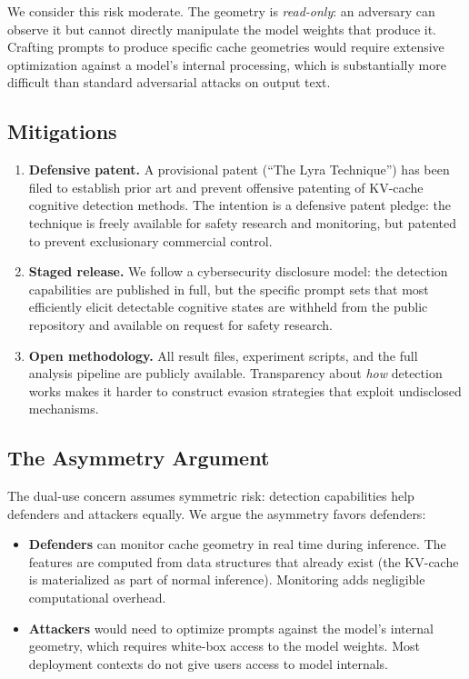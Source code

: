 We consider this risk moderate. The geometry is \emph{read-only}: an adversary can observe it but cannot directly manipulate the model weights that produce it. Crafting prompts to produce specific cache geometries would require extensive optimization against a model's internal processing, which is substantially more difficult than standard adversarial attacks on output text.

\subsection{Mitigations}

\begin{enumerate}[leftmargin=*]
    \item \textbf{Defensive patent.} A provisional patent (``The Lyra Technique'') has been filed to establish prior art and prevent offensive patenting of KV-cache cognitive detection methods. The intention is a defensive patent pledge: the technique is freely available for safety research and monitoring, but patented to prevent exclusionary commercial control.

    \item \textbf{Staged release.} We follow a cybersecurity disclosure model: the detection capabilities are published in full, but the specific prompt sets that most efficiently elicit detectable cognitive states are withheld from the public repository and available on request for safety research.

    \item \textbf{Open methodology.} All result files, experiment scripts, and the full analysis pipeline are publicly available. Transparency about \emph{how} detection works makes it harder to construct evasion strategies that exploit undisclosed mechanisms.
\end{enumerate}

\subsection{The Asymmetry Argument}

The dual-use concern assumes symmetric risk: detection capabilities help defenders and attackers equally. We argue the asymmetry favors defenders:

\begin{itemize}[leftmargin=*]
    \item \textbf{Defenders} can monitor cache geometry in real time during inference. The features are computed from data structures that already exist (the KV-cache is materialized as part of normal inference). Monitoring adds negligible computational overhead.
    \item \textbf{Attackers} would need to optimize prompts against the model's internal geometry, which requires white-box access to the model weights. Most deployment contexts do not give users access to model internals.
\end{itemize}

